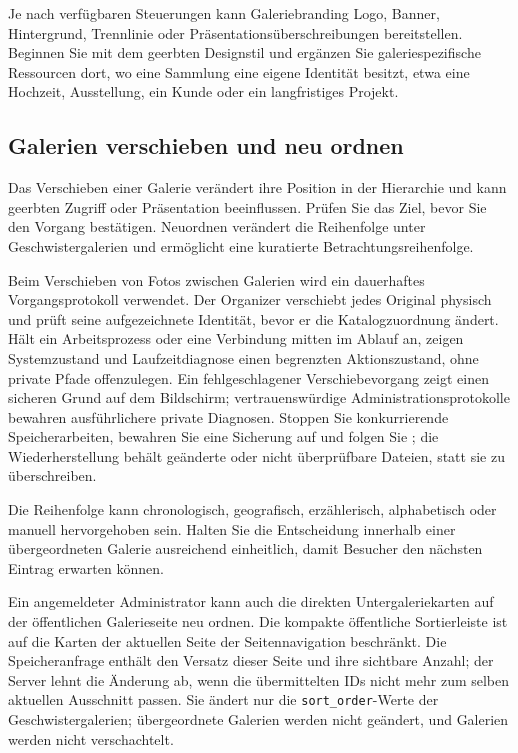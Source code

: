 \documentclass[11pt,a4paper]{article}
\newcommand{\filepath}[1]{\path{#1}}
\newcommand{\codeword}[1]{\nolinkurl{#1}}
\begin{document}
Je nach verfügbaren Steuerungen kann Galeriebranding Logo, Banner, Hintergrund,
Trennlinie oder Präsentationsüberschreibungen bereitstellen. Beginnen Sie mit
dem geerbten Designstil und ergänzen Sie galeriespezifische Ressourcen dort, wo
eine Sammlung eine eigene Identität besitzt, etwa eine Hochzeit, Ausstellung,
ein Kunde oder ein langfristiges Projekt.

\subsection{Galerien verschieben und neu ordnen}

Das Verschieben einer Galerie verändert ihre Position in der Hierarchie und kann
geerbten Zugriff oder Präsentation beeinflussen. Prüfen Sie das Ziel, bevor Sie
den Vorgang bestätigen. Neuordnen verändert die Reihenfolge unter
Geschwistergalerien und ermöglicht eine kuratierte Betrachtungsreihenfolge.

Beim Verschieben von Fotos zwischen Galerien wird ein dauerhaftes
Vorgangsprotokoll verwendet. Der Organizer verschiebt jedes Original physisch
und prüft seine aufgezeichnete Identität, bevor er die Katalogzuordnung ändert.
Hält ein Arbeitsprozess oder eine Verbindung mitten im Ablauf an, zeigen
Systemzustand und Laufzeitdiagnose einen begrenzten Aktionszustand, ohne private
Pfade offenzulegen. Ein fehlgeschlagener Verschiebevorgang zeigt einen sicheren
Grund auf dem Bildschirm; vertrauenswürdige Administrationsprotokolle bewahren
ausführlichere private Diagnosen. Stoppen Sie konkurrierende Speicherarbeiten,
bewahren Sie eine Sicherung auf und folgen Sie
\filepath{docs/IMAGE_MOVE_RECOVERY.md}; die Wiederherstellung behält geänderte
oder nicht überprüfbare Dateien, statt sie zu überschreiben.

Die Reihenfolge kann chronologisch, geografisch, erzählerisch, alphabetisch oder
manuell hervorgehoben sein. Halten Sie die Entscheidung innerhalb einer
übergeordneten Galerie ausreichend einheitlich, damit Besucher den nächsten
Eintrag erwarten können.

Ein angemeldeter Administrator kann auch die direkten Untergaleriekarten auf der
öffentlichen Galerieseite neu ordnen. Die kompakte öffentliche Sortierleiste ist
auf die Karten der aktuellen Seite der Seitennavigation beschränkt. Die
Speicheranfrage enthält den Versatz dieser Seite und ihre sichtbare Anzahl; der
Server lehnt die Änderung ab, wenn die übermittelten IDs nicht mehr zum selben
aktuellen Ausschnitt passen. Sie ändert nur die \codeword{sort_order}-Werte der
Geschwistergalerien; übergeordnete Galerien werden nicht geändert, und Galerien
werden nicht verschachtelt.
\end{document}
